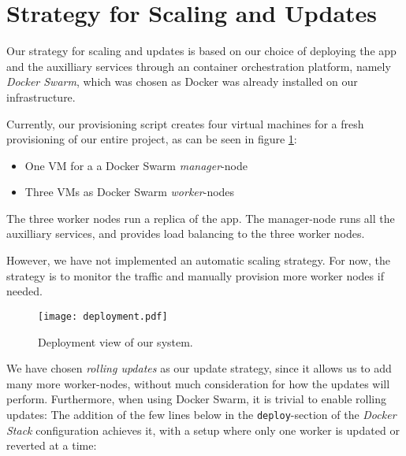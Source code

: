 \section{Strategy for Scaling and Updates}\label{sec:scaling}

Our strategy for scaling and updates is based on our choice of deploying the app and the auxilliary services through an container orchestration platform, namely \textit{Docker Swarm}, which was chosen as Docker was already installed on our infrastructure.

Currently, our provisioning script creates four virtual machines for a fresh provisioning of our entire project, as can be seen in figure \ref{fig:deployment}:

\begin{itemize}
	\item One VM for a a Docker Swarm \textit{manager}-node
	\item Three VMs as Docker Swarm \textit{worker}-nodes
\end{itemize}

The three worker nodes run a replica of the app.
The manager-node runs all the auxilliary services, and provides load balancing to the three worker nodes.

However, we have not implemented an automatic scaling strategy. For now, the strategy is to monitor the traffic and manually provision more worker nodes if needed.

\begin{figure}
	\begin{center}
		\texttt{[image: deployment.pdf]}
	\end{center}
	\caption{Deployment view of our system.}\label{fig:deployment}
\end{figure}

We have chosen \textit{rolling updates} as our update strategy, since it allows us to add many more worker-nodes, without much consideration for how the updates will perform.
Furthermore, when using Docker Swarm, it is trivial to enable rolling updates: The addition of the few lines below in the \texttt{deploy}-section of the \textit{Docker Stack} configuration achieves it, with a setup where only one worker is updated or reverted at a time:

